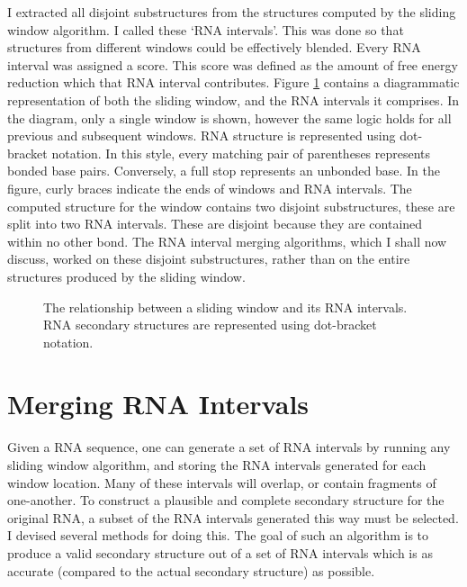 \documentclass{cshonours}
\begin{document}
I extracted all disjoint substructures from the structures computed by the sliding window algorithm. I called these `RNA intervals'. This was done so that structures from different windows could be effectively blended. Every RNA interval was assigned a score. This score was defined as the amount of free energy reduction which that RNA interval contributes. Figure \ref{fig:rnainterval} contains a diagrammatic representation of both the sliding window, and the RNA intervals it comprises. In the diagram, only a single window is shown, however the same logic holds for all previous and subsequent windows. RNA structure is represented using dot-bracket notation. In this style, every matching pair of parentheses represents bonded base pairs. Conversely, a full stop represents an unbonded base. In the figure, curly braces indicate the ends of windows and RNA intervals. The computed structure for the window contains two disjoint substructures, these are split into two RNA intervals. These are disjoint because they are contained within no other bond. The RNA interval merging algorithms, which I shall now discuss, worked on these disjoint substructures, rather than on the entire structures produced by the sliding window.


\begin{figure}
\begin{center}
\end{center}
\caption{The relationship between a sliding window and its RNA intervals. RNA secondary structures are represented using dot-bracket notation.}
\label{fig:rnainterval}
\end{figure}




\section{Merging RNA Intervals}
\label{sec:merging}

Given a RNA sequence, one can generate a set of RNA intervals by running any sliding window algorithm, and storing the RNA intervals generated for each window location. Many of these intervals will overlap, or contain fragments of one-another. To construct a plausible and complete secondary structure for the original RNA, a subset of the RNA intervals generated this way must be selected. I devised several methods for doing this. The goal of such an algorithm is to produce a valid secondary structure out of a set of RNA intervals which is as accurate (compared to the actual secondary structure) as possible.
\end{document}
